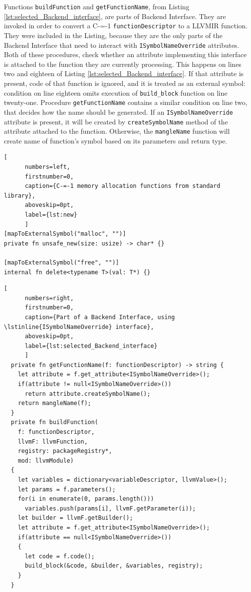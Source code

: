 Functions \lstinline{buildFunction} and \lstinline{getFunctionName}, from Listing \ref{lst:selected_Backend_interface}, are parts of Backend Interface.
They are invoked in order to convert a C-=-1 \lstinline{functionDescriptor} to a LLVMIR function.
They were included in the Listing, because they are the only parts of the Backend Interface that need to interact with \lstinline{ISymbolNameOverride} attributes.
Both of these procedures, check whether an attribute implementing this interface is attached to the function they are currently processing.
This happens on lines two and eighteen of Listing \ref{lst:selected_Backend_interface}.
If that attribute is present, code of that function is ignored, and it is treated as an external symbol: condition on line eighteen omits execution of \lstinline{build_block} function on line twenty-one.
Procedure \lstinline{getFunctionName} contains a similar condition on line two, that decides how the name should be generated.
If an \lstinline{ISymbolNameOverride} attribute is present, it will be created by \lstinline{createSymbolName} method of the attribute attached to the function.
Otherwise, the \lstinline{mangleName} function will create name of function's symbol based on its parameters and return type.

\begin{minipage}{\linewidth}

	\begin{lstlisting}[
	  numbers=left,
	  firstnumber=0,
	  caption={C-=-1 memory allocation functions from standard library},
	  aboveskip=0pt,
	  label={lst:new}
	  ]
[mapToExternalSymbol("malloc", "")]
private fn unsafe_new(size: usize) -> char* {}

[mapToExternalSymbol("free", "")]
internal fn delete<typename T>(val: T*) {}

  \end{lstlisting}
\end{minipage}


\begin{minipage}{8cm}
	\centering
	\begin{lstlisting}[
	  numbers=right,
	  firstnumber=0,
	  caption={Part of a Backend Interface, using \lstinline{ISymbolNameOverride} interface},
	  aboveskip=0pt,
	  label={lst:selected_Backend_interface}
	  ]
  private fn getFunctionName(f: functionDescriptor) -> string {
	let attribute = f.get_attribute<ISymbolNameOverride>();
	if(attribute != null<ISymbolNameOverride>())
	  return attribute.createSymbolName();
	return mangleName(f);
  }
  private fn buildFunction(
	f: functionDescriptor,
	llvmF: llvmFunction,
	registry: packageRegistry*,
	mod: llvmModule)
  {
	let variables = dictionary<variableDescriptor, llvmValue>();
	let params = f.parameters();
	for(i in enumerate(0, params.length()))
	  variables.push(params[i], llvmF.getParameter(i));
	let builder = llvmF.getBuilder();
	let attribute = f.get_attribute<ISymbolNameOverride>();
	if(attribute == null<ISymbolNameOverride>())
	{
	  let code = f.code();
	  build_block(&code, &builder, &variables, registry);
	}
  }
  \end{lstlisting}
\end{minipage}


